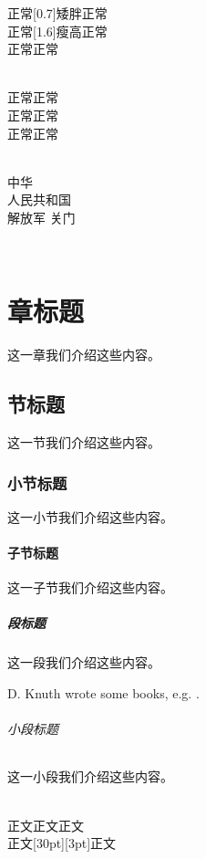 \documentclass[UTF8,a5paper,12pt,portrait,openary,final]{ctexbook}
\begin{document}
正常\scalebox{1.6}[0.7]{矮胖}正常
\\
正常\scalebox{0.7}[1.6]{瘦高}正常
\\
正常正常

\\

正常正常
\\正常正常
\\正常正常




\\
中华\\
人民{\huge 共和国}\\
解放军 关门

\\







\chapter{章标题}
这一章我们介绍这些内容。
\section{节标题}
这一节我们介绍这些内容。
\subsection{小节标题}
这一小节我们介绍这些内容。
\subsubsection{子节标题}
这一子节我们介绍这些内容。
\paragraph{段标题}
这一段我们介绍这些内容。

D. Knuth wrote some books, e.g. \cite{DK1, DK2}.
\subparagraph{小段标题}
这一小段我们介绍这些内容。







\\
正文正文正文\\
正文\raisebox{6pt}[30pt][3pt]{}正文


\\
\end{document}
